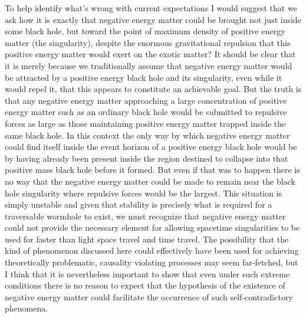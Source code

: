 \documentclass[notitlepage,12pt]{report}
\begin{document}
To help identify what's wrong with current expectations I would suggest that we ask how it is exactly that negative energy matter could be brought not just inside some black hole, but toward the point of maximum density of positive energy matter (the singularity), despite the enormous gravitational repulsion that this positive energy matter would exert on the exotic matter? It should be clear that it is merely because we traditionally assume that negative energy matter would be attracted by a positive energy black hole and its singularity, even while it would repel it, that this appears to constitute an achievable goal. But the truth is that any negative energy matter approaching a large concentration of positive energy matter such as an ordinary black hole would be submitted to repulsive forces as large as those maintaining positive energy matter trapped inside the same black hole. In this context the only way by which negative energy matter could find itself inside the event horizon of a positive energy black hole would be by having already been present inside the region destined to collapse into that positive mass black hole before it formed. But even if that was to happen there is no way that the negative energy matter could be made to remain near the black hole singularity where repulsive forces would be the largest. This situation is simply unstable and given that stability is precisely what is required for a traversable wormhole to exist, we must recognize that negative energy matter could not provide the necessary element for allowing spacetime singularities to be used for faster than light space travel and time travel. The possibility that the kind of phenomenon discussed here could effectively have been used for achieving theoretically problematic, causality violating processes may seem far-fetched, but I think that it is nevertheless important to show that even under such extreme conditions there is no reason to expect that the hypothesis of the existence of negative energy matter could facilitate the occurrence of such self-contradictory phenomena.
\end{document}
